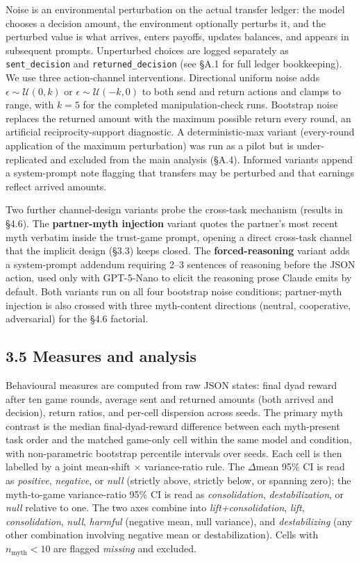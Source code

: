 \documentclass[10pt,letterpaper]{article}
\begin{document}
Noise is an environmental perturbation on the actual transfer ledger:
the model chooses a decision amount, the environment optionally perturbs
it, and the perturbed value is what arrives, enters payoffs, updates
balances, and appears in subsequent prompts. Unperturbed choices are
logged separately as \texttt{sent\_decision} and
\texttt{returned\_decision} (see §A.1 for full ledger bookkeeping). We
use three action-channel interventions. Directional uniform noise adds
\(\epsilon \sim \mathcal{U}(0,k)\) or
\(\epsilon \sim \mathcal{U}(-k,0)\) to both send and return actions and
clamps to range, with \(k=5\) for the completed manipulation-check runs.
Bootstrap noise replaces the returned amount with the maximum possible
return every round, an artificial reciprocity-support diagnostic. A
deterministic-max variant (every-round application of the maximum
perturbation) was run as a pilot but is under-replicated and excluded
from the main analysis (§A.4). Informed variants append a system-prompt
note flagging that transfers may be perturbed and that earnings reflect
arrived amounts.

Two further channel-design variants probe the cross-task mechanism
(results in §4.6). The \textbf{partner-myth injection} variant quotes
the partner's most recent myth verbatim inside the trust-game prompt,
opening a direct cross-task channel that the implicit design (§3.3)
keeps closed. The \textbf{forced-reasoning} variant adds a system-prompt
addendum requiring 2--3 sentences of reasoning before the JSON action,
used only with GPT-5-Nano to elicit the reasoning prose Claude emits by
default. Both variants run on all four bootstrap noise conditions;
partner-myth injection is also crossed with three myth-content
directions (neutral, cooperative, adversarial) for the §4.6 factorial.

\subsection{3.5 Measures and analysis}\label{measures-and-analysis}

Behavioural measures are computed from raw JSON states: final dyad
reward after ten game rounds, average sent and returned amounts (both
arrived and decision), return ratios, and per-cell dispersion across
seeds. The primary myth contrast is the median final-dyad-reward
difference between each myth-present task order and the matched
game-only cell within the same model and condition, with non-parametric
bootstrap percentile intervals over seeds. Each cell is then labelled by
a joint mean-shift × variance-ratio rule. The \(\Delta\)mean 95\% CI is
read as \emph{positive}, \emph{negative}, or \emph{null} (strictly
above, strictly below, or spanning zero); the myth-to-game
variance-ratio 95\% CI is read as \emph{consolidation},
\emph{destabilization}, or \emph{null} relative to one. The two axes
combine into \emph{lift+consolidation}, \emph{lift},
\emph{consolidation}, \emph{null}, \emph{harmful} (negative mean, null
variance), and \emph{destabilizing} (any other combination involving
negative mean or destabilization). Cells with \(n_{\text{myth}} < 10\)
are flagged \emph{missing} and excluded.
\end{document}
